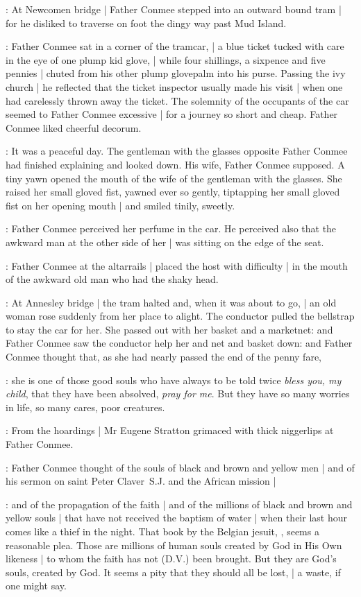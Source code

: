 :
At Newcomen bridge |
Father Conmee stepped into an outward bound tram |
for he disliked to traverse on foot the dingy way past Mud Island.

:
Father Conmee sat in a corner of the tramcar, |
a blue ticket tucked with care in the eye of one plump kid glove, |
while four shillings, a sixpence and five pennies |
chuted from his other plump glovepalm into his purse.
Passing the ivy church |
he reflected that the ticket inspector usually made his visit |
when one had carelessly thrown away the ticket.
The solemnity of the occupants of the car
seemed to Father Conmee excessive |
for a journey so short and cheap.
Father Conmee liked cheerful decorum.

:
It was a peaceful day.
The gentleman with the glasses opposite Father Conmee
had finished explaining and looked down.
His wife, Father Conmee supposed.
A tiny yawn opened the mouth of the wife of the gentleman with the glasses.
She raised her small gloved fist,
yawned ever so gently,
tiptapping her small gloved fist on her opening mouth |
and smiled tinily, sweetly.

:
Father Conmee perceived her perfume in the car.
He perceived also that the awkward man at the other side of her |
was sitting on the edge of the seat.%

:
Father Conmee at the altarrails |
placed the host with difficulty |
in the mouth of the awkward old man who had the shaky head.

:
At Annesley bridge |
the tram halted and, when it was about to go, |
an old woman rose suddenly from her place to alight.
The conductor pulled the bellstrap to stay the car for her.
She passed out with her basket and a marketnet:
and Father Conmee saw the conductor help her and net and basket down:
and Father Conmee thought
that, as she had nearly passed the end of the penny fare,

\conmeeint:
she is one of those good souls who have always to be told twice
\emph{bless you, my child},
that they have been absolved,
\emph{pray for me}.
But they have so many worries in life,
so many cares, poor creatures.

:
From the hoardings |
Mr Eugene Stratton grimaced with thick niggerlips at Father Conmee.

:
Father Conmee thought of the souls of black and brown and yellow men |
and of his sermon on saint Peter Claver~S.J. and the African mission |

\conmeeint:
and of the propagation of the faith |
and of the millions of black and brown and yellow souls |
that have not received the baptism of water |
when their last hour comes like a thief in the night.
That book by the Belgian jesuit,
,
seems a reasonable plea.
Those are millions of human souls created by God in His Own likeness |
to whom the faith has not (D.V.) been brought.
But they are God's souls, created by God.
It seems a pity that they should all be lost, |
a waste, if one might say.

